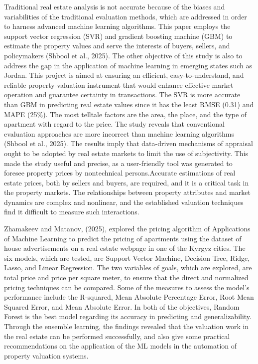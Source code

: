 \documentclass[12pt, a4paper, oneside]{book}
\begin{document}
Traditional real estate analysis is not accurate because of the biases and variabilities of the traditional evaluation methods, which are addressed in order to harness advanced machine learning algorithms. This paper employs the support vector regression (SVR) and gradient boosting machine (GBM) to estimate the property values and serve the interests of buyers, sellers, and policymakers (Shbool et al., 2025). The other objective of this study is also to address the gap in the application of machine learning in emerging states such as Jordan. This project is aimed at ensuring an efficient, easy-to-understand, and reliable property-valuation instrument that would enhance effective market operation and guarantee certainty in transactions. The SVR is more accurate than GBM in predicting real estate values since it has the least RMSE (0.31) and MAPE (25\%). The most telltale factors are the area, the place, and the type of apartment with regard to the price. The study reveals that conventional evaluation approaches are more incorrect than machine learning algorithms (Shbool et al., 2025). The results imply that data-driven mechanisms of appraisal ought to be adopted by real estate markets to limit the use of subjectivity. This made the study useful and precise, as a user-friendly tool was generated to foresee property prices by nontechnical persons.Accurate estimations of real estate prices, both by sellers and buyers, are required, and it is a critical task in the property markets. The relationships between property attributes and market dynamics are complex and nonlinear, and the established valuation techniques find it difficult to measure such interactions. 


Zhamakeev and Matanov, (2025), explored the pricing algorithm of Applications of Machine Learning to predict the pricing of apartments using the dataset of house advertisements on a real estate webpage in one of the Kyrgyz cities. The six models, which are tested, are Support Vector Machine, Decision Tree, Ridge, Lasso, and Linear Regression. The two variables of goals, which are explored, are total price and price per square meter, to ensure that the direct and normalized pricing techniques can be compared. Some of the measures to assess the model's performance include the R-squared, Mean Absolute Percentage Error, Root Mean Squared Error, and Mean Absolute Error. In both of the objectives, Random Forest is the best model regarding its accuracy in predicting and generalizability. Through the ensemble learning, the findings revealed that the valuation work in the real estate can be performed successfully, and also give some practical recommendations on the application of the ML models in the automation of property valuation systems.
\end{document}

